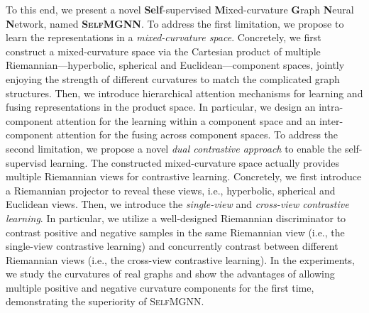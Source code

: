 To this end, we present a novel \textbf{Self}-supervised \textbf{M}ixed-curvature \textbf{G}raph \textbf{N}eural \textbf{N}etwork, named \textbf{\textsc{SelfMGNN}}. %
To address the first limitation, 
we propose to learn the representations in a \emph{mixed-curvature space}.
Concretely, we first construct a mixed-curvature space via the Cartesian product of multiple Riemannian—hyperbolic, spherical and Euclidean—component spaces, jointly enjoying the strength of different curvatures to match the complicated graph structures.
Then, we introduce hierarchical attention mechanisms for learning and fusing representations in the product space.
In particular, we design an intra-component attention for the learning within a component space
and an inter-component attention for the fusing across component spaces.
To address the second limitation, 
we propose a novel \emph{dual contrastive approach} to enable the self-supervisd learning.
The constructed mixed-curvature space %
actually provides multiple Riemannian views for contrastive learning.
Concretely, we first introduce a Riemannian projector to reveal these views, i.e., hyperbolic, spherical and Euclidean views. 
Then, we introduce the \emph{single-view} and \emph{cross-view contrastive learning}. %
In particular, we utilize a well-designed Riemannian discriminator to 
contrast positive and negative samples in the same Riemannian view  (i.e., the single-view contrastive learning)
and concurrently contrast between different Riemannian views (i.e., the cross-view contrastive learning).
In the experiments, we study the curvatures of real graphs and show the advantages of allowing multiple positive and negative curvature components for the first time,  
demonstrating the superiority of \textsc{SelfMGNN}.

